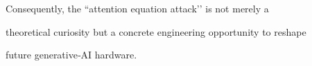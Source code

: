 Consequently, the “attention equation attack’’ is not merely a






theoretical curiosity but a concrete engineering opportunity to reshape






future generative‑AI hardware.






















































































